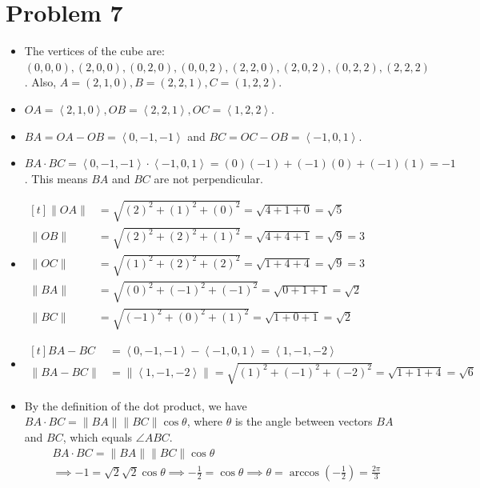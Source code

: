 \documentclass{article}
\newcommand*{\problem}[1]{\section*{Problem #1}}
\begin{document}
\problem{7}
\begin{itemize}
	\item[(a)] The vertices of the cube are: $\left( 0,0,0 \right),\left( 2,0,0 \right), \left( 0,2,0 \right), \left( 0,0,2 \right), \left( 2,2,0 \right), \left( 2,0,2 \right), \left( 0,2,2 \right), \left( 2,2,2 \right)$. Also, $A=\left( 2,1,0 \right), B=\left( 2,2,1 \right), C=\left( 1,2,2 \right)$.

	\item[(b)] $OA=\left< 2,1,0 \right>, OB=\left< 2,2,1 \right>, OC=\left< 1,2,2 \right>$.

	\item[(c)] $BA=\boxed{OA-OB}=\left< 0,-1,-1 \right>$ and $BC=\boxed{OC-OB}=\left< -1,0,1 \right>$.

	\item[(d)] $BA\cdot BC=\left< 0,-1,-1 \right>\cdot \left< -1,0,1 \right>=(0)(-1)+(-1)(0)+(-1)(1)=\boxed{-1}$. This means $BA$ and $BC$ are not perpendicular.

	\item[(e)]
		$\begin{aligned}[t]
			\lVert OA \rVert &=\sqrt{(2)^2+(1)^2+(0)^2}=\sqrt{4+1+0}=\boxed{\sqrt{5}} \\
			\lVert OB \rVert &=\sqrt{(2)^2+(2)^2+(1)^2}=\sqrt{4+4+1}=\sqrt{9}=\boxed{3} \\
			\lVert OC \rVert &=\sqrt{(1)^2+(2)^2+(2)^2}=\sqrt{1+4+4}=\sqrt{9}=\boxed{3} \\
			\lVert BA \rVert &=\sqrt{(0)^2+(-1)^2+(-1)^2}=\sqrt{0+1+1}=\boxed{\sqrt{2}} \\
			\lVert BC \rVert &=\sqrt{(-1)^2+(0)^2+(1)^2}=\sqrt{1+0+1}=\boxed{\sqrt{2}}
		\end{aligned}$

	\item[(f)]
		$\begin{aligned}[t]
		    BA-BC
			&=\left< 0,-1,-1 \right>-\left< -1,0,1 \right>
			=\boxed{\left< 1,-1,-2 \right>} \\
			\lVert BA-BC \rVert 
			&=\lVert \left< 1,-1,-2 \right> \rVert 
			=\sqrt{(1)^2+(-1)^2+(-2)^2}
			=\sqrt{1+1+4}
			=\boxed{\sqrt{6}}
		\end{aligned}$

	\item[(g)]
		By the definition of the dot product, we have $BA\cdot BC=\lVert BA \rVert \lVert BC \rVert \cos \theta$, where $\theta$ is the angle between vectors $BA$ and $BC$, which equals $\angle ABC$.
		\begin{gather*}
			BA\cdot BC=\lVert BA \rVert \lVert BC \rVert \cos \theta \\
			\implies -1=\sqrt{2}\sqrt{2}\cos \theta 
			\implies -\frac12=\cos\theta
			\implies \theta=\arccos\left(-\frac12\right)
			=\boxed{\frac{2\pi}{3}}
		\end{gather*}
\end{itemize}
\end{document}
